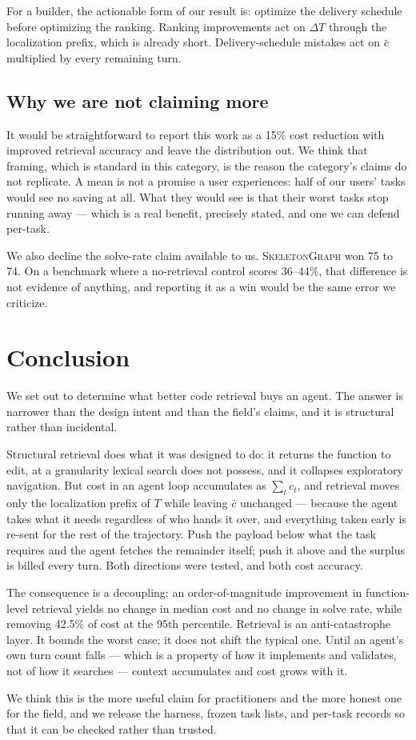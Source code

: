 \documentclass[11pt,letterpaper]{article}
\newcommand{\sg}{\textsc{SkeletonGraph}}
\begin{document}
For a builder, the actionable form of our result is: optimize the delivery
schedule before optimizing the ranking. Ranking improvements act on $\Delta T$
through the localization prefix, which is already short. Delivery-schedule
mistakes act on $\bar{c}$ multiplied by every remaining turn.

\subsection{Why we are not claiming more}
It would be straightforward to report this work as a 15\% cost reduction with
improved retrieval accuracy and leave the distribution out. We think that
framing, which is standard in this category, is the reason the category's claims
do not replicate. A mean is not a promise a user experiences: half of our users'
tasks would see no saving at all. What they would see is that their worst tasks
stop running away --- which is a real benefit, precisely stated, and one we can
defend per-task.

We also decline the solve-rate claim available to us. \sg{} won 75 to 74. On a
benchmark where a no-retrieval control scores 36--44\%, that difference is not
evidence of anything, and reporting it as a win would be the same error we
criticize.

\section{Conclusion}
We set out to determine what better code retrieval buys an agent. The answer is
narrower than the design intent and than the field's claims, and it is
structural rather than incidental.

Structural retrieval does what it was designed to do: it returns the function to
edit, at a granularity lexical search does not possess, and it collapses
exploratory navigation. But cost in an agent loop accumulates as
$\sum_t c_t$, and retrieval moves only the localization prefix of $T$ while
leaving $\bar{c}$ unchanged --- because the agent takes what it needs regardless
of who hands it over, and everything taken early is re-sent for the rest of the
trajectory. Push the payload below what the task requires and the agent fetches
the remainder itself; push it above and the surplus is billed every turn. Both
directions were tested, and both cost accuracy.

The consequence is a decoupling: an order-of-magnitude improvement in
function-level retrieval yields no change in median cost and no change in solve
rate, while removing 42.5\% of cost at the 95th percentile. Retrieval is an
anti-catastrophe layer. It bounds the worst case; it does not shift the typical
one. Until an agent's own turn count falls --- which is a property of how it
implements and validates, not of how it searches --- context accumulates and cost
grows with it.

We think this is the more useful claim for practitioners and the more honest one
for the field, and we release the harness, frozen task lists, and per-task records
so that it can be checked rather than trusted.


\end{document}
